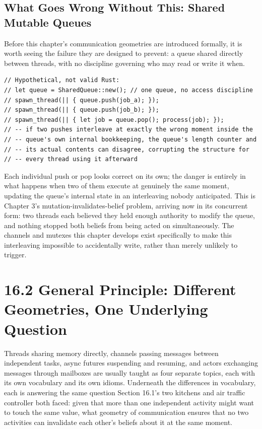 \documentclass[11pt]{book}
\begin{document}
\subsection*{What Goes Wrong Without This: Shared Mutable Queues}

Before this chapter's communication geometries are introduced formally, it is worth seeing the failure they are designed to prevent: a queue shared directly between threads, with no discipline governing who may read or write it when.

\begin{lstlisting}
// Hypothetical, not valid Rust:
// let queue = SharedQueue::new(); // one queue, no access discipline
// spawn_thread(|| { queue.push(job_a); });
// spawn_thread(|| { queue.push(job_b); });
// spawn_thread(|| { let job = queue.pop(); process(job); });
// -- if two pushes interleave at exactly the wrong moment inside the
// -- queue's own internal bookkeeping, the queue's length counter and
// -- its actual contents can disagree, corrupting the structure for
// -- every thread using it afterward
\end{lstlisting}

Each individual push or pop looks correct on its own; the danger is entirely in what happens when two of them execute at genuinely the same moment, updating the queue's internal state in an interleaving nobody anticipated. This is Chapter 3's mutation-invalidates-belief problem, arriving now in its concurrent form: two threads each believed they held enough authority to modify the queue, and nothing stopped both beliefs from being acted on simultaneously. The channels and mutexes this chapter develops exist specifically to make this interleaving impossible to accidentally write, rather than merely unlikely to trigger.

\section*{16.2 General Principle: Different Geometries, One Underlying Question}

Threads sharing memory directly, channels passing messages between independent tasks, async futures suspending and resuming, and actors exchanging messages through mailboxes are usually taught as four separate topics, each with its own vocabulary and its own idioms. Underneath the differences in vocabulary, each is answering the same question Section 16.1's two kitchens and air traffic controller both faced: given that more than one independent activity might want to touch the same value, what geometry of communication ensures that no two activities can invalidate each other's beliefs about it at the same moment.
\end{document}
